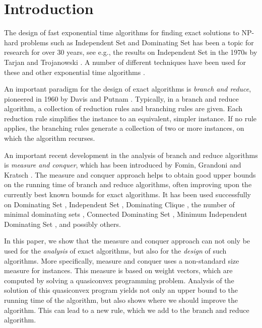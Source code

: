 \documentclass[fleqn]{stacs_proc}
\begin{document}



\section{Introduction}
The design of fast exponential time algorithms for finding exact solutions to
NP-hard problems such as {\sc Independent Set} and {\sc Dominating Set}
has been a topic for research for over 30 years, see e.g., the results
on {\sc Independent Set} in the 1970s by Tarjan and Trojanowski 
\cite{Tarjan72a,TarjanT77}. A number of different techniques have been used
for these and other exponential time algorithms \cite{FominGK05,Woeginger03,Woeginger04}.

An important paradigm for the design of exact algorithms is {\em branch and reduce},
pioneered in 1960 by Davis and Putnam \cite{DavisP60}. Typically, in a branch
and reduce algorithm, a collection of reduction rules
and branching rules are given.
Each reduction rule simplifies the instance to an equivalent, simpler
instance. If no rule applies, the branching rules generate a collection of two or more instances,
on which the algorithm recurses.

An important recent development in the analysis of branch and reduce algorithms is
{\em measure and conquer}, which has been introduced by Fomin, Grandoni and Kratsch \cite{FominGK05a}.
The measure and conquer approach helps to obtain good upper bounds on the running time
of branch and reduce algorithms, often improving upon the currently best known bounds for
exact algorithms. It has been used successfully on 
{\sc Dominating Set} \cite{FominGK05a}, {\sc Independent Set} \cite{FominGK06},
{\sc Dominating Clique} \cite{KratschL06}, the number of minimal dominating sets
\cite{FominGPS05}, {\sc Connected Dominating Set} \cite{FominGK06a}, {\sc Minimum Independent
Dominating Set} \cite{GaspersL06}, and possibly others.

In this paper, we show that the measure and conquer approach can not only be used
for the {\em analysis} of exact algorithms, but also for the {\em design} of such algorithms.
More specifically, measure and conquer uses a non-standard size measure for instances.
This measure is based on weight vectors, which are computed by solving a quasiconvex programming problem.
Analysis of the solution of this quasiconvex program yields not only an upper bound
to the running time of the algorithm, but also shows where we should improve
the algorithm. This can lead to a new rule, which we add to the branch and
reduce algorithm. 
\end{document}

